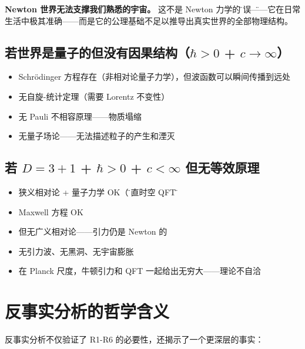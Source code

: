\textbf{Newton 世界无法支撑我们熟悉的宇宙。} 这不是 Newton 力学的\"错误\"——它在日常生活中极其准确——而是它的公理基础不足以推导出真实世界的全部物理结构。

\subsection{若世界是量子的但没有因果结构（$\hbar > 0$ + $c\to\infty$）}

\begin{itemize}
  \item Schr\"odinger 方程存在（非相对论量子力学），但波函数可以瞬间传播到远处
  \item 无自旋-统计定理（需要 Lorentz 不变性）
  \item 无 Pauli 不相容原理——物质塌缩
  \item 无量子场论——无法描述粒子的产生和湮灭
\end{itemize}

\subsection{若 $D=3+1$ + $\hbar>0$ + $c<\infty$ 但无等效原理}

\begin{itemize}
  \item 狭义相对论 + 量子力学 OK（\"平直时空 QFT\"）
  \item Maxwell 方程 OK
  \item 但无广义相对论——引力仍是 Newton 的
  \item 无引力波、无黑洞、无宇宙膨胀
  \item 在 Planck 尺度，牛顿引力和 QFT 一起给出无穷大——理论不自洽
\end{itemize}

\section{反事实分析的哲学含义}

反事实分析不仅验证了 R1-R6 的必要性，还揭示了一个更深层的事实：

